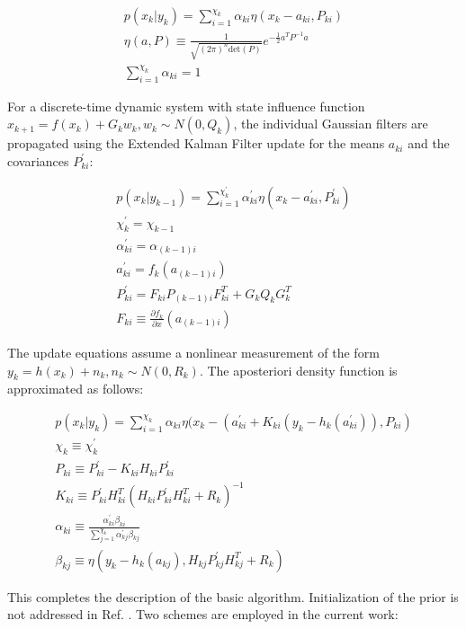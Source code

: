 \documentclass[]{article}
\begin{document}
\begin{align}
	p(x_k | y_k) = \sum_{i=1}^{\chi_k} \alpha_{ki} \eta(x_k-a_{ki},P_{ki}) \\
	\eta(a,P) \equiv \frac{1}{\sqrt{(2\pi)^n \mathrm{det}(P)}} e^{-\frac{1}{2} a^T P^{-1} a} \\
	\sum_{i=1}^{\chi_k} \alpha_{ki} = 1
\end{align}

For a discrete-time dynamic system with state influence function $x_{k+1} = f(x_k) + G_k w_k,w_k \sim N(0,Q_k)$, the individual Gaussian filters are propagated using the Extended Kalman Filter update for the means $a_{ki}$ and the covariances $P_{ki}^{'}$:

\begin{align}
	p(x_{k} | y_{k-1}) = \sum_{i=1}^{\chi_{k}^{'}} \alpha_{ki}^{'} \eta(x_{k}-a_{ki}^{'},P_{ki}^{'}) \\
	\chi_{k}^{'} = \chi_{k-1} \\
	\alpha_{ki}^{'} = \alpha_{(k-1)i} \\
	a_{ki}^{'} = f_k(a_{(k-1)i})\\
	P_{ki}^{'} = F_{ki}P_{(k-1)i}F_{ki}^T + G_{k} Q_k G_{k}^T \\
	F_{ki} \equiv \frac{\partial f_k}{\partial x} (a_{(k-1)i})
\end{align}

The update equations assume a nonlinear measurement of the form $y_k = h(x_k) + n_k, n_k \sim N(0,R_k)$. The aposteriori density function is approximated as follows:

\begin{align}
	p(x_{k} | y_{k}) = \sum_{i=1}^{\chi_{k}} \alpha_{ki} \eta(x_k-(a_{ki}^{'}+K_{ki}(y_k-h_k(a_{ki}^{'})),P_{ki}) \\
	\chi_k \equiv \chi_{k}^{'} \\
	P_{ki} \equiv P_{ki}^{'} - K_{ki} H_{ki} P_{ki}^{'} \\
	K_{ki} \equiv P_{ki}^{'} H_{ki}^T (H_{ki} P_{ki}^{'} H_{ki}^T + R_k)^{-1} \\
	\alpha_{ki} \equiv \frac{\alpha_{ki}^{'} \beta_{ki}}{\sum_{j=1}^{\chi_k} \alpha_{kj}^{'} \beta_{kj} } \\
	\beta_{kj} \equiv \eta(y_k - h_k(a_{kj}),H_{kj}P_{kj}^{'}H_{kj}^T + R_k)
\end{align}

This completes the description of the basic algorithm. Initialization of the prior is not addressed in Ref. \cite{alspach}. Two schemes are employed in the current work:
\end{document}
